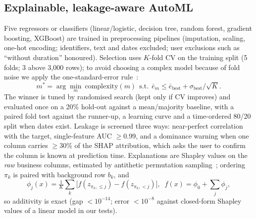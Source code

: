 \documentclass[conference]{IEEEtran}
\begin{document}
\subsection{Explainable, leakage-aware AutoML}
Five regressors or classifiers (linear/logistic, decision tree, random forest, gradient boosting, XGBoost) are trained in preprocessing pipelines (imputation, scaling, one-hot encoding; identifiers, text and dates excluded; user exclusions such as ``without duration'' honoured). Selection uses $K$-fold CV on the training split (5 folds; 3 above 3,000 rows); to avoid choosing a complex model because of fold noise we apply the one-standard-error rule~\cite{hastie2009}:
\begin{equation}
m^{*}=\arg\min_{m}\ \mathrm{complexity}(m)\ \ \text{s.t.}\ \ \bar{e}_m\le \bar{e}_{\mathrm{best}}+\sigma_{\mathrm{best}}/\sqrt{K}.
\end{equation}
The winner is tuned by randomised search (kept only if CV improves) and evaluated once on a 20\% hold-out against a mean/majority baseline, with a paired fold test against the runner-up, a learning curve and a time-ordered 80/20 split when dates exist. Leakage is screened three ways: near-perfect correlation with the target, single-feature AUC $\geq$0.99, and a dominance warning when one column carries $\geq$30\% of the SHAP attribution, which asks the user to confirm the column is known at prediction time. Explanations are Shapley values on the \emph{raw} business columns, estimated by antithetic permutation sampling~\cite{strumbelj2014,lundberg2017}; ordering $\pi_k$ is paired with background row $b_k$, and
\begin{equation}
\phi_j(x)=\tfrac{1}{K}\textstyle\sum_{k}\big[f(z_{\pi_k,\le j})-f(z_{\pi_k,<j})\big],\;\; f(x)=\phi_0+\textstyle\sum_j\phi_j,
\end{equation}
so additivity is exact (gap $<10^{-14}$; error $<10^{-8}$ against closed-form Shapley values of a linear model in our tests).
\end{document}
